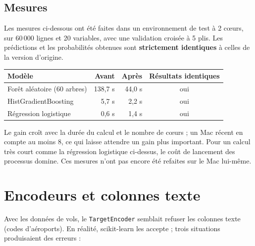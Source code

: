 \documentclass[11pt,a4paper]{article}
\newcommand{\code}[1]{\texttt{#1}}
\begin{document}
\subsection{Mesures}

Les mesures ci-dessous ont été faites dans un environnement de test à 2 cœurs, sur
60\,000 lignes et 20 variables, avec une validation croisée à 5 plis. Les prédictions
et les probabilités obtenues sont \textbf{strictement identiques} à celles de la
version d'origine.

\begin{center}
\begin{tabular}{lrrc}
  \toprule
  \textbf{Modèle} & \textbf{Avant} & \textbf{Après} & \textbf{Résultats identiques} \\
  \midrule
  Forêt aléatoire (60 arbres) & 138,7 s & 44,0 s & oui \\
  HistGradientBoosting        & 5,7 s   & 2,2 s  & oui \\
  Régression logistique       & 0,6 s   & 1,4 s  & oui \\
  \bottomrule
\end{tabular}
\end{center}

Le gain croît avec la durée du calcul et le nombre de cœurs ; un Mac récent en
compte au moins 8, ce qui laisse attendre un gain plus important. Pour un calcul très
court comme la régression logistique ci-dessus, le coût de lancement des processus
domine. Ces mesures n'ont pas encore été refaites sur le Mac lui-même.

\section{Encodeurs et colonnes texte}

Avec les données de vols, le \code{TargetEncoder} semblait refuser les colonnes
texte (codes d'aéroports). En réalité, scikit-learn les accepte ; trois situations
produisaient des erreurs :
\end{document}
